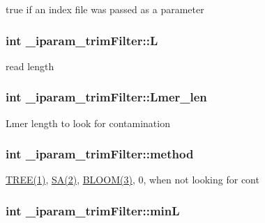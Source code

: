 true if an index file was passed as a parameter \hypertarget{struct__iparam__trimFilter_a72fcc236d4136d2405a04f155b515894}{
\subsubsection[{L}]{\setlength{\rightskip}{0pt plus 5cm}int \+\_\+iparam\+\_\+trim\+Filter\+::\+L}}\label{struct__iparam__trimFilter_a72fcc236d4136d2405a04f155b515894}
read length \hypertarget{struct__iparam__trimFilter_a8d64cf4832f3c403bd7c505d5a3fee75}{
\subsubsection[{Lmer\+\_\+len}]{\setlength{\rightskip}{0pt plus 5cm}int \+\_\+iparam\+\_\+trim\+Filter\+::\+Lmer\+\_\+len}}\label{struct__iparam__trimFilter_a8d64cf4832f3c403bd7c505d5a3fee75}
Lmer length to look for contamination \hypertarget{struct__iparam__trimFilter_a0b5f9bed4a7b4e2de8c917b42360f4d3}{
\subsubsection[{method}]{\setlength{\rightskip}{0pt plus 5cm}int \+\_\+iparam\+\_\+trim\+Filter\+::method}}\label{struct__iparam__trimFilter_a0b5f9bed4a7b4e2de8c917b42360f4d3}
\hyperlink{defines_8h_abf5b8fbbeb8255336e401a15a80214a8}{T\+R\+E\+E(1)}, \hyperlink{defines_8h_a1e43924adac4ae865aa0acf79710261c}{S\+A(2)}, \hyperlink{defines_8h_a7dcb6cfd9e186d997dce1d6cabe58898}{B\+L\+O\+O\+M(3)}, 0, when not looking for cont \hypertarget{struct__iparam__trimFilter_ac2b43664ca0c95a8572f97254893d675}{
\subsubsection[{min\+L}]{\setlength{\rightskip}{0pt plus 5cm}int \+\_\+iparam\+\_\+trim\+Filter\+::min\+L}}\label{struct__iparam__trimFilter_ac2b43664ca0c95a8572f97254893d675}
